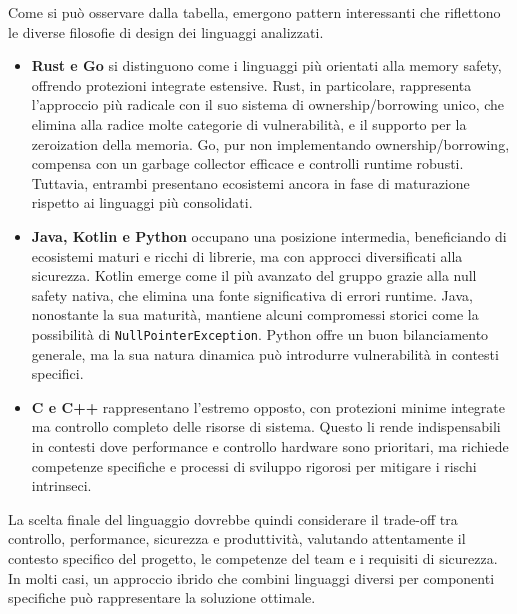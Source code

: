 
\newpage
\noindent

Come si può osservare dalla tabella, emergono pattern interessanti che
riflettono le diverse filosofie di design dei linguaggi analizzati.

\begin{itemize}
  \item \textbf{Rust e Go} si distinguono come i linguaggi più orientati alla
    memory safety, offrendo protezioni integrate estensive. Rust, in particolare,
    rappresenta l'approccio più radicale con il suo sistema di ownership/borrowing
    unico, che elimina alla radice molte categorie di vulnerabilità, e il
    supporto per la zeroization della memoria. Go, pur non implementando
    ownership/borrowing, compensa con un garbage collector efficace e controlli runtime
    robusti. Tuttavia, entrambi presentano ecosistemi ancora in fase di maturazione
    rispetto ai linguaggi più consolidati.

  \item \textbf{Java, Kotlin e Python} occupano una posizione intermedia, beneficiando
    di ecosistemi maturi e ricchi di librerie, ma con approcci diversificati
    alla sicurezza. Kotlin emerge come il più avanzato del gruppo grazie alla null
    safety nativa, che elimina una fonte significativa di errori runtime. Java,
    nonostante la sua maturità, mantiene alcuni compromessi storici come la possibilità
    di \texttt{NullPointerException}. Python offre un buon bilanciamento generale,
    ma la sua natura dinamica può introdurre vulnerabilità in contesti specifici.

  \item \textbf{C e C++} rappresentano l'estremo opposto, con protezioni minime integrate
    ma controllo completo delle risorse di sistema. Questo li rende
    indispensabili in contesti dove performance e controllo hardware sono
    prioritari, ma richiede competenze specifiche e processi di sviluppo rigorosi
    per mitigare i rischi intrinseci.
\end{itemize}

La scelta finale del linguaggio dovrebbe quindi considerare il trade-off tra controllo,
performance, sicurezza e produttività, valutando attentamente il contesto
specifico del progetto, le competenze del team e i requisiti di sicurezza. In
molti casi, un approccio ibrido che combini linguaggi diversi per componenti specifiche
può rappresentare la soluzione ottimale.